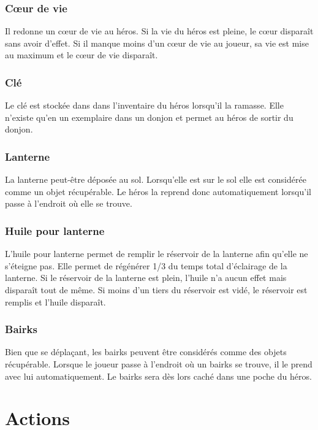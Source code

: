 \documentclass[a4paper, 11pt]{report}
\begin{document}
        \subsection{Cœur de vie}
          Il redonne un cœur de vie au héros. Si la vie du héros est pleine, le cœur disparaît sans avoir d'effet.
          Si il manque moins d'un cœur de vie au joueur, sa vie est mise au maximum et le cœur de vie
          disparaît.
        
        \subsection{Clé}
          Le clé est stockée dans dans l'inventaire du héros lorsqu'il la ramasse. Elle n'existe qu'en un 
          exemplaire dans un donjon et permet au héros de sortir du donjon.
          
        \subsection{Lanterne}
          La lanterne peut-être déposée au sol. Lorsqu'elle est sur le sol elle est considérée comme un objet
          récupérable. Le héros la reprend donc automatiquement lorsqu'il passe à l'endroit où elle se trouve.
          
        \subsection{Huile pour lanterne}
          L'huile pour lanterne permet de remplir le réservoir de la lanterne afin qu'elle ne s'éteigne pas. Elle
          permet de régénérer 1/3 du temps total d'éclairage de la lanterne. Si le réservoir de la lanterne est 
          plein, l'huile n'a aucun effet mais disparaît tout de même. Si moins d'un tiers du réservoir est vidé, 
          le réservoir est remplis et l'huile disparaît.
          
        \subsection{Bairks}
          Bien que se déplaçant, les bairks peuvent être considérés comme des objets récupérable. Lorsque
          le joueur passe à l'endroit où un bairks se trouve, il le prend avec lui automatiquement. Le bairks
          sera dès lors caché dans une poche du héros.
          
    \chapter{Actions}
      
\end{document}
